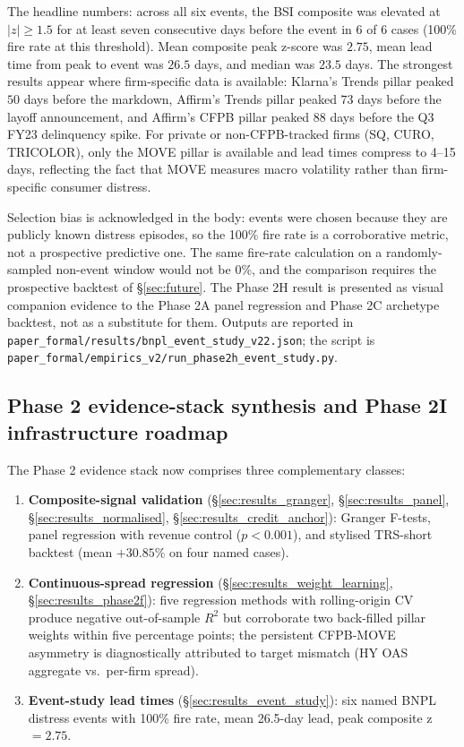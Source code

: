 \documentclass[11pt,a4paper]{article}
\begin{document}
{\sloppy The headline numbers: across all six events, the BSI composite was elevated at $|z| \ge 1.5$ for at least seven consecutive days before the event in 6 of 6 cases (100\% fire rate at this threshold). Mean composite peak z-score was $2.75$, mean lead time from peak to event was $26.5$ days, and median was $23.5$ days. The strongest results appear where firm-specific data is available: Klarna's Trends pillar peaked $50$ days before the markdown, Affirm's Trends pillar peaked $73$ days before the layoff announcement, and Affirm's CFPB pillar peaked $88$ days before the Q3 FY23 delinquency spike. For private or non-CFPB-tracked firms (SQ, CURO, TRICOLOR), only the MOVE pillar is available and lead times compress to 4--15 days, reflecting the fact that MOVE measures macro volatility rather than firm-specific consumer distress.}

Selection bias is acknowledged in the body: events were chosen because they are publicly known distress episodes, so the 100\% fire rate is a corroborative metric, not a prospective predictive one. The same fire-rate calculation on a randomly-sampled non-event window would not be 0\%, and the comparison requires the prospective backtest of §\ref{sec:future}. The Phase 2H result is presented as visual companion evidence to the Phase 2A panel regression and Phase 2C archetype backtest, not as a substitute for them. Outputs are reported in \texttt{paper\_formal/results/bnpl\_event\_study\_v22.json}; the script is \texttt{paper\_formal/empirics\_v2/run\_phase2h\_event\_study.py}.

\subsection{Phase 2 evidence-stack synthesis and Phase 2I infrastructure roadmap}\label{sec:phase2_synthesis}

The Phase 2 evidence stack now comprises three complementary classes:
\begin{enumerate}
\item \textbf{Composite-signal validation} (§\ref{sec:results_granger}, §\ref{sec:results_panel}, §\ref{sec:results_normalised}, §\ref{sec:results_credit_anchor}): Granger F-tests, panel regression with revenue control ($p < 0.001$), and stylised TRS-short backtest (mean $+30.85\%$ on four named cases).
\item \textbf{Continuous-spread regression} (§\ref{sec:results_weight_learning}, §\ref{sec:results_phase2f}): five regression methods with rolling-origin CV produce negative out-of-sample $R^2$ but corroborate two back-filled pillar weights within five percentage points; the persistent CFPB-MOVE asymmetry is diagnostically attributed to target mismatch (HY OAS aggregate vs.\ per-firm spread).
\item \textbf{Event-study lead times} (§\ref{sec:results_event_study}): six named BNPL distress events with 100\% fire rate, mean 26.5-day lead, peak composite z $= 2.75$.
\end{enumerate}
\end{document}
